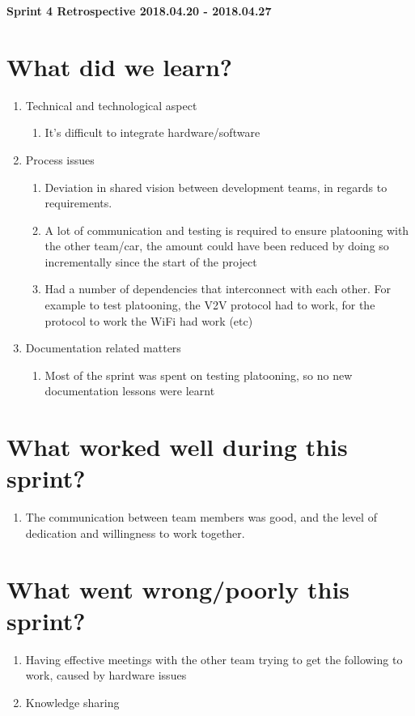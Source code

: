 \documentclass[11pt]{article}
\begin{document}
\centerline{\textbf{\LARGE Sprint 4 Retrospective 2018.04.20 - 2018.04.27}}

\section*{What did we learn?}
\begin{enumerate}
	\item Technical and technological aspect
		\begin{enumerate} 
			\item It’s difficult to integrate hardware/software
		\end{enumerate} 
	\item Process issues
		\begin{enumerate} 
			\item Deviation in shared vision between development teams, in regards to requirements. 
			\item A lot of communication and testing is required to ensure platooning with the other team/car, the amount could have been reduced by doing so incrementally since the start of the project
			\item Had a number of dependencies that interconnect with each other. For example to test platooning, the V2V protocol had to work, for the protocol to work the WiFi had work (etc)
		\end{enumerate}		
	\item Documentation related matters
		\begin{enumerate} 
			\item Most of the sprint was spent on testing platooning, so no new documentation lessons were learnt 
		\end{enumerate}	
\end{enumerate} 

\section*{What worked well during this sprint?}
\begin{enumerate}
	\item The communication between team members was good, and the level of dedication and willingness to work together.
\end{enumerate} 

\section*{What went wrong/poorly this sprint?}
\begin{enumerate}
	\item Having effective meetings with the other team trying to get the following to work, caused by hardware issues
	\item Knowledge sharing
\end{enumerate} 
\end{document}
